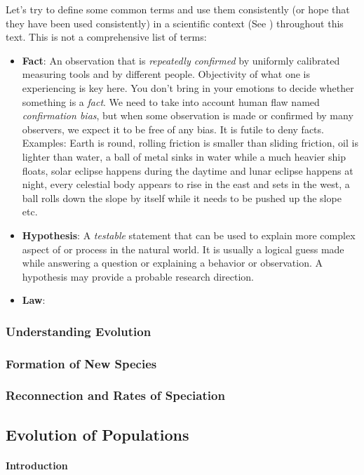 Let's try to define some common terms and use them consistently (or hope that they have been used consistently) in a scientific context (See \cite{teaching-evol}) throughout this text. This is not a comprehensive list of terms:
\begin{itemize}
    \item \textbf{Fact}: An observation that is \emph{repeatedly confirmed} by uniformly calibrated measuring tools and by different people. Objectivity of what one is experiencing is key here. You don't bring in your emotions to decide whether something is a \emph{fact}. We need to take into account human flaw named \emph{confirmation bias}, but when some observation is made or confirmed by many observers, we expect it to be free of any bias. It is futile to deny facts. Examples: Earth is round, rolling friction is smaller than sliding friction, oil is lighter than water, a ball of metal sinks in water while a much heavier ship floats, solar eclipse happens during the daytime and lunar eclipse happens at night, every celestial body appears to rise in the east and sets in the west, a ball rolls down the slope by itself while it needs to be pushed up the slope etc.
    \item \textbf{Hypothesis}: A \emph{testable} statement that can be used to explain more complex aspect of or process in the natural world. It is usually a logical guess made while answering a question or explaining a behavior or observation. A hypothesis may provide a probable research direction.
    \item \textbf{Law}: 
\end{itemize}

\subsubsection{Understanding Evolution}
\subsubsection{Formation of New Species}
\subsubsection{Reconnection and Rates of Speciation}


\subsection{Evolution of Populations}
\paragraph{Introduction}
